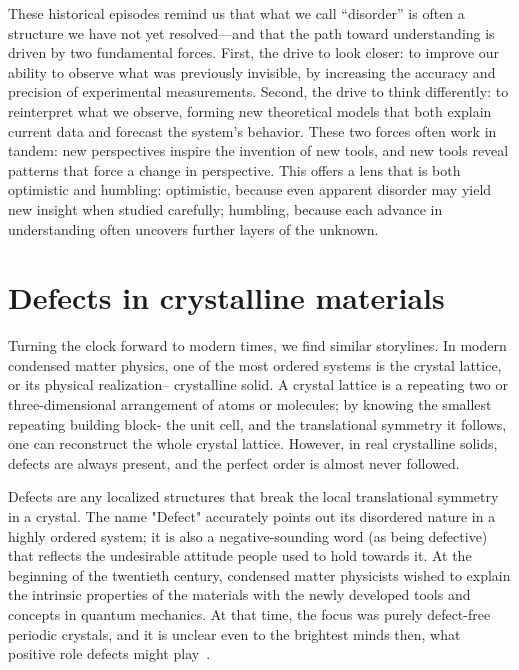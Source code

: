 These historical episodes remind us that what we call “disorder” is often a structure we have not yet resolved—and that the path toward understanding is driven by two fundamental forces. First, the drive to look closer: to improve our ability to observe what was previously invisible, by increasing the accuracy and precision of experimental measurements. Second, the drive to think differently: to reinterpret what we observe, forming new theoretical models that both explain current data and forecast the system’s behavior. These two forces often work in tandem: new perspectives inspire the invention of new tools, and new tools reveal patterns that force a change in perspective. This offers a lens that is both optimistic and humbling: optimistic, because even apparent disorder may yield new insight when studied carefully; humbling, because each advance in understanding often uncovers further layers of the unknown.

\section{Defects in crystalline materials}
Turning the clock forward to modern times, we find similar storylines. In modern condensed matter physics, one of the most ordered systems is the crystal lattice, or its physical realization-- crystalline solid. A crystal lattice is a repeating two or three-dimensional arrangement of atoms or molecules; by knowing the smallest repeating building block- the unit cell, and the translational symmetry it follows, one can reconstruct the whole crystal lattice. However, in real crystalline solids, defects are always present, and the perfect order is almost never followed. 

Defects are any localized structures that break the local translational symmetry in a crystal. The name "Defect" accurately points out its disordered nature in a highly ordered system; it is also a negative-sounding word (as being defective) that reflects the undesirable attitude people used to hold towards it. At the beginning of the twentieth century, condensed matter physicists wished to explain the intrinsic properties of the materials with the newly developed tools and concepts in quantum mechanics. At that time, the focus was purely defect-free periodic crystals, and it is unclear even to the brightest minds then, what positive role defects might play~\cite{lorentzVortrageUberKinetische1914, spitalerPerspectivesTheoryDefects2018}. 

